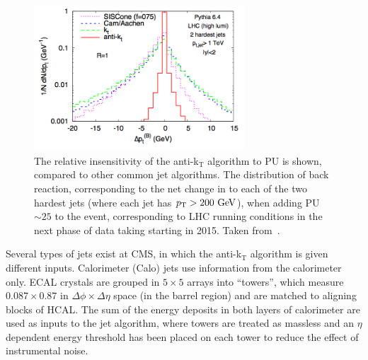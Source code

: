 \begin{figure}[htbp]
  \begin{center}
  \includegraphics[width=0.7\textwidth]{Figures/detector/PUantiKT}
  \caption{The relative insensitivity of the anti-k$_{\mathrm{T}}$ algorithm to \ac{PU} is shown, compared to other common jet algorithms. The distribution of back reaction, corresponding to the net change in \pt to each of the two hardest jets (where each jet has $p_{\text{T}}>200~\mathrm{GeV}$), when adding \ac{PU}$\sim 25$ to the event, corresponding to \ac{LHC} running conditions in the next phase of data taking starting in 2015. Taken from~\cite{bib:akjets}.}
  \label{fig:antikT_PU}
  \end{center}
\end{figure}

Several types of jets exist at \ac{CMS}, in which the anti-k$_{\mathrm{T}}$ algorithm is given different inputs.
Calorimeter (Calo) jets use information from the calorimeter only.
\ac{ECAL} crystals are grouped in $5\times5$ arrays into ``towers'', which measure $0.087\times0.87$ in $\Delta\phi \times \Delta \eta$ space (in the barrel region) and are matched to aligning blocks of \ac{HCAL}.
The sum of the energy deposits in both layers of calorimeter are used as inputs to the jet algorithm, where towers are treated as massless and an $\eta$ dependent energy threshold has been placed on each tower to reduce the effect of instrumental noise. 

